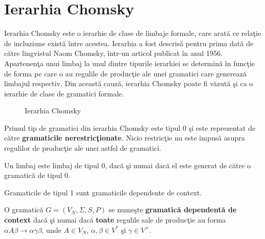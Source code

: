 \section{Ierarhia Chomsky}

Ierarhia Chomsky este o ierarhie de clase de limbaje formale, care arată ce relaţie de incluziune există între acestea. Ierarhia a fost descrisă pentru prima dată de către lingvistul Naom Chomsky, într-un articol publicat în anul 1956. Apartenenţa unui limbaj la unul dintre tipurile ierarhiei se determină în funcţie de forma pe care o au regulile de producţie ale unei gramatici care generează limbajul respectiv. Din această cauză, ierarhia Chomsky poate fi văzută şi ca o ierarhie de clase de gramatici formale.

\begin{figure}[H]
\centering
{}
\label{FiguraIerarhiaChomsky}
\caption{Ierarhia Chomsky}
\end{figure}

Primul tip de gramatici din ierarhia Chomsky este tipul 0 şi este reprezentat de către \textbf{gramaticile nerestricţionate}. Nicio restricţie nu este impusă asupra regulilor de producţie ale unei astfel de gramatici.

Un limbaj este limbaj de tipul 0, dacă şi numai dacă el este generat de către o gramatică de tipul 0.

Gramaticile de tipul 1 sunt gramaticile dependente de context.

\begin{definitie}
O gramatică $G = (V_{N}, \Sigma, S, P )$ se numeşte \textbf{gramatică dependentă de context} dacă şi numai dacă \textbf{toate} regulile sale de producţie au forma $\alpha A \beta \rightarrow \alpha \gamma \beta$, unde $A \in V_{N}$, $\alpha, \beta \in V^{*}$ şi $\gamma \in V^{+}$.
\end{definitie}

